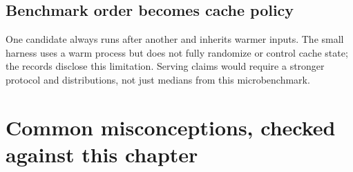 \subsection{Benchmark order becomes cache
policy}\label{benchmark-order-becomes-cache-policy}

One candidate always runs after another and inherits warmer inputs. The
small harness uses a warm process but does not fully randomize or
control cache state; the records disclose this limitation. Serving
claims would require a stronger protocol and distributions, not just
medians from this microbenchmark.

\section{Common misconceptions, checked against this
chapter}\label{common-misconceptions-checked-against-this-chapter}


